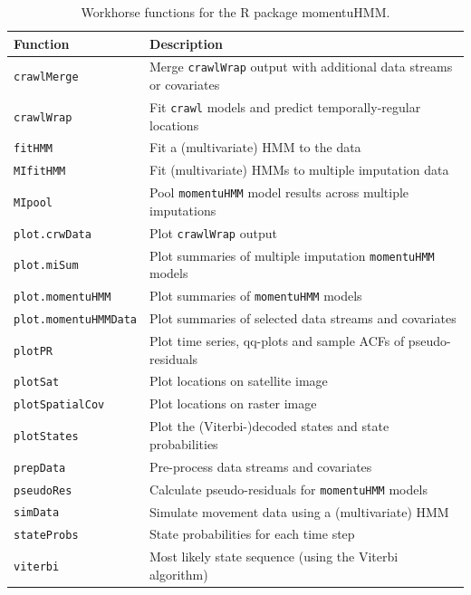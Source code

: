 \documentclass[12pt]{article}\usepackage[]{graphicx}\usepackage[]{color}
\begin{document}
\begin{table}
  \caption{\label{tab:functions} Workhorse functions for the R package momentuHMM.}
  \begin{tabular}{ll}
  \toprule
  Function & Description \tabularnewline
  \midrule
  \verb|crawlMerge| & Merge \verb|crawlWrap| output with additional data streams or covariates  \tabularnewline 
  \verb|crawlWrap| & Fit \verb|crawl| models and predict temporally-regular locations  \tabularnewline  
  \verb|fitHMM| & Fit a (multivariate) HMM to the data  \tabularnewline  
  \verb|MIfitHMM| & Fit (multivariate) HMMs to multiple imputation data  \tabularnewline  
  \verb|MIpool| & Pool \verb|momentuHMM| model results across multiple imputations  \tabularnewline 
  \verb|plot.crwData| & Plot \verb|crawlWrap| output \tabularnewline 
  \verb|plot.miSum| & Plot summaries of multiple imputation \verb|momentuHMM| models  \tabularnewline 
  \verb|plot.momentuHMM| & Plot summaries of \verb|momentuHMM| models  \tabularnewline 
  \verb|plot.momentuHMMData| & Plot summaries of selected data streams and covariates  \tabularnewline 
  \verb|plotPR| & Plot time series, qq-plots and sample ACFs of pseudo-residuals \tabularnewline 
  \verb|plotSat| & Plot locations on satellite image \tabularnewline   
  \verb|plotSpatialCov| & Plot locations on raster image \tabularnewline   
  \verb|plotStates| & Plot the (Viterbi-)decoded states and state probabilities \tabularnewline 
  \verb|prepData| & Pre-process data streams and covariates \tabularnewline 
  \verb|pseudoRes| & Calculate pseudo-residuals for \verb|momentuHMM| models \tabularnewline 
  \verb|simData| & Simulate movement data using a (multivariate) HMM \tabularnewline 
  \verb|stateProbs| & State probabilities for each time step \tabularnewline 
  \verb|viterbi| & Most likely state sequence (using the Viterbi algorithm)  \tabularnewline  
  \bottomrule
  \end{tabular}
\end{table}
\end{document}
